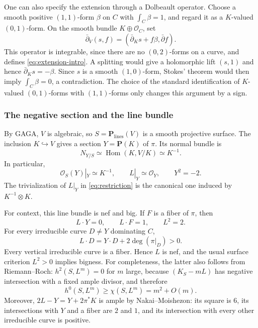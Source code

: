 \documentclass[11pt]{amsart}
\theoremstyle{definition}
\theoremstyle{remark}
\numberwithin{equation}{section}
\newcommand{\PP}{\mathbf P}
\newcommand{\OO}{\mathcal O}
\newcommand{\barp}{\bar\partial}
\begin{document}
One can also specify the extension through a Dolbeault operator. Choose
a smooth positive $(1,1)$-form $\beta$ on $C$ with
$\int_C\beta=1$, and regard it as a $K$-valued $(0,1)$-form. On the
smooth bundle $K\oplus\OO_C$, set
\begin{equation}\label{eq:dolbeault-extension}
 \barp_V(s,f)=(\barp_Ks+f\beta,\barp f).
\end{equation}
This operator is integrable, since there are no $(0,2)$-forms on a
curve, and defines \eqref{eq:extension-intro}. A splitting would give a
holomorphic lift $(s,1)$ and hence $\barp_Ks=-\beta$. Since $s$ is a
smooth $(1,0)$-form, Stokes' theorem would then imply
$\int_C\beta=0$, a contradiction. The choice of the standard
identification of $K$-valued $(0,1)$-forms with $(1,1)$-forms only changes
this argument by a sign.

\subsubsection{The negative section and the line bundle}

By GAGA, $V$ is algebraic, so $S=\PP_{\mathrm{lines}}(V)$ is a smooth
projective surface. The inclusion $K\hookrightarrow V$ gives a section
$Y=\PP(K)$ of $\pi$. Its normal bundle is
\begin{equation}\label{eq:normal}
 N_{Y/S}\simeq\operatorname{Hom}(K,V/K)\simeq K^{-1}.
\end{equation}
In particular,
\begin{equation}\label{eq:restriction}
 \OO_S(Y)|_Y\simeq K^{-1},\qquad
 L|_Y\simeq\OO_Y,\qquad Y^2=-2.
\end{equation}
The trivialization of $L|_Y$ in \eqref{eq:restriction} is the canonical
one induced by $K^{-1}\otimes K$.

For context, this line bundle is nef and big. If $F$ is a fiber of $\pi$,
then
\[
 L\cdot Y=0,\qquad L\cdot F=1,\qquad L^2=2.
\]
For every irreducible curve $D\ne Y$ dominating $C$,
\[
 L\cdot D=Y\cdot D+2\deg(\pi|_D)>0.
\]
Every vertical irreducible curve is a fiber. Hence $L$ is nef, and the
usual surface criterion $L^2>0$ implies bigness. For completeness, the
latter also follows from Riemann--Roch: $h^2(S,L^m)=0$ for $m$ large,
because $(K_S-mL)$ has negative intersection with a fixed ample divisor,
and therefore
\[
 h^0(S,L^m)\ge\chi(S,L^m)=m^2+O(m).
\]
Moreover, $2L-Y=Y+2\pi^*K$ is ample by Nakai--Moishezon: its square is
$6$, its intersections with $Y$ and a fiber are $2$ and $1$, and its
intersection with every other irreducible curve is positive.
\end{document}
